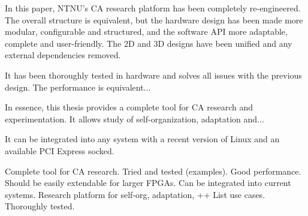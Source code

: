 In this paper, NTNU's CA research platform has been completely re-engineered.
The overall structure is equivalent, but the hardware design has been made more modular, configurable and structured, and the software API more adaptable, complete and user-friendly.
The 2D and 3D designs have been unified and any external dependencies removed.

It has been thoroughly tested in hardware and solves all issues with the previous design.
The performance is equivalent... \TODO

In essence, this thesis provides a complete tool for CA research and experimentation.
It allows study of self-organization, adaptation and... \TODO

It can be integrated into any system with a recent version of Linux and an available PCI Express socked.

Complete tool for CA research.
Tried and tested (examples).
Good performance.
Should be easily extendable for larger FPGAs.
Can be integrated into current systems.
Research platform for self-org, adaptation, ++
List use cases.
Thoroughly tested.
